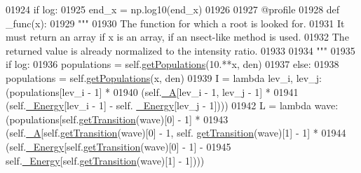 \begin{DoxyCode}
01924                 \textcolor{keywordflow}{if} log:
01925                     end\_x = np.log10(end\_x)
01926             
01927             @profile
01928             \textcolor{keyword}{def }\_func(x):
01929                 \textcolor{stringliteral}{"""}
01930 \textcolor{stringliteral}{                The function for which a root is looked for.}
01931 \textcolor{stringliteral}{                It must return an array if x is an array, if an nsect-like method is used.}
01932 \textcolor{stringliteral}{                The returned value is already normalized to the intensity ratio.}
01933 \textcolor{stringliteral}{}
01934 \textcolor{stringliteral}{                """}
01935                 \textcolor{keywordflow}{if} log:
01936                     populations = self.\hyperlink{classpyneb_1_1core_1_1pynebcore_1_1_atom_aab7496403c8aaef40ab3b20b5c00e9f0}{getPopulations}(10.**x, den)
01937                 \textcolor{keywordflow}{else}:
01938                     populations = self.\hyperlink{classpyneb_1_1core_1_1pynebcore_1_1_atom_aab7496403c8aaef40ab3b20b5c00e9f0}{getPopulations}(x, den)
01939                 I = \textcolor{keyword}{lambda} lev\_i, lev\_j: (populations[lev\_i - 1] * 
01940                                           (self.\hyperlink{classpyneb_1_1core_1_1pynebcore_1_1_atom_aa6416fe661b8deaa008179314727e025}{\_A}[lev\_i - 1, lev\_j - 1] * 
01941                                            (self.\hyperlink{classpyneb_1_1core_1_1pynebcore_1_1_atom_a52e68715246d258bf0a14f4bd06e89e4}{\_Energy}[lev\_i - 1] - self.
      \hyperlink{classpyneb_1_1core_1_1pynebcore_1_1_atom_a52e68715246d258bf0a14f4bd06e89e4}{\_Energy}[lev\_j - 1])))
01942                 L = \textcolor{keyword}{lambda} wave: (populations[self.\hyperlink{classpyneb_1_1core_1_1pynebcore_1_1_atom_a7c9f17a3d9e841267add92377d9d1ede}{getTransition}(wave)[0] - 1] * 
01943                                   (self.\hyperlink{classpyneb_1_1core_1_1pynebcore_1_1_atom_aa6416fe661b8deaa008179314727e025}{\_A}[self.\hyperlink{classpyneb_1_1core_1_1pynebcore_1_1_atom_a7c9f17a3d9e841267add92377d9d1ede}{getTransition}(wave)[0] - 1, self.
      \hyperlink{classpyneb_1_1core_1_1pynebcore_1_1_atom_a7c9f17a3d9e841267add92377d9d1ede}{getTransition}(wave)[1] - 1] * 
01944                                    (self.\hyperlink{classpyneb_1_1core_1_1pynebcore_1_1_atom_a52e68715246d258bf0a14f4bd06e89e4}{\_Energy}[self.\hyperlink{classpyneb_1_1core_1_1pynebcore_1_1_atom_a7c9f17a3d9e841267add92377d9d1ede}{getTransition}(wave)[0] - 1] - 
01945                                     self.\hyperlink{classpyneb_1_1core_1_1pynebcore_1_1_atom_a52e68715246d258bf0a14f4bd06e89e4}{\_Energy}[self.\hyperlink{classpyneb_1_1core_1_1pynebcore_1_1_atom_a7c9f17a3d9e841267add92377d9d1ede}{getTransition}(wave)[1] - 1])))

\end{DoxyCode}
